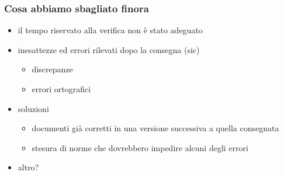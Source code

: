 \begin{frame}
\frametitle{Cosa abbiamo sbagliato finora}

\begin{itemize}
\item il tempo riservato alla verifica non è stato adeguato
\item inesattezze ed errori rilevati dopo la consegna (sic)
\begin{itemize}
\item discrepanze
\item errori ortografici
\end{itemize}


\item soluzioni
\begin{itemize}
\item documenti già corretti in una versione successiva a quella consegnata
\item stesura di norme che dovrebbero impedire alcuni degli errori
\end{itemize}

\item \alert{altro?}
\end{itemize}

\end{frame}

